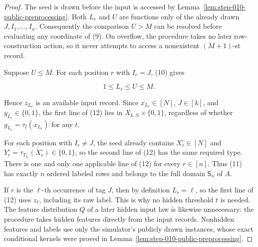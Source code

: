 \begin{proof}
The seed is drawn before the input is accessed by
Lemma~\ref{lem:step-010-public-preprocessing}. Both \(L_r\) and \(U\) are
functions only of the already drawn \(J,I_1,\ldots,I_n\). Consequently the
comparison \(U>M\) can be resolved before evaluating any coordinate of
(9). On overflow, the procedure takes no later row-construction action, so
it never attempts to access a nonexistent \((M+1)\)-st record.

Suppose \(U\le M\). For each position \(r\) with \(I_r=J\), (10) gives

\[
  1\le L_r\le U\le M.
\tag{13}
\]

Hence \(z_{L_r}\) is an available input record. Since
\(x_{L_r}\in[N]\), \(J\in[k]\), and \(y_{L_r}\in\{0,1\}\), the first line
of (12) lies in \(X_{k,N}\times\{0,1\}\), regardless of whether
\(y_{L_r}=\tau_t(x_{L_r})\) for any \(t\).

For each position with \(I_r\ne J\), the seed already contains
\(X_r^\circ\in[N]\) and
\(Y_r^\circ=\tau_{T_{I_r}}(X_r^\circ)\in\{0,1\}\), so the second line of
(12) has the same required type. There is one and only one applicable line
of (12) for every \(r\in[n]\). Thus (11) has exactly \(n\) ordered labeled
rows and belongs to the full domain \(\mathsf S_n\) of \(A\).

If \(r\) is the \(\ell\)-th occurrence of tag \(J\), then by definition
\(L_r=\ell\), so the first line of (12) uses \(z_\ell\), including its raw
label. This is why no hidden threshold \(t\) is needed. The feature
distribution \(Q\) of a later hidden input law is likewise unnecessary:
the procedure takes hidden features directly from the input records.
Nonhidden features and labels use only the simulator's publicly drawn
instances, whose exact conditional kernels were proved in
Lemma~\ref{lem:step-010-public-preprocessing}.
\end{proof}

